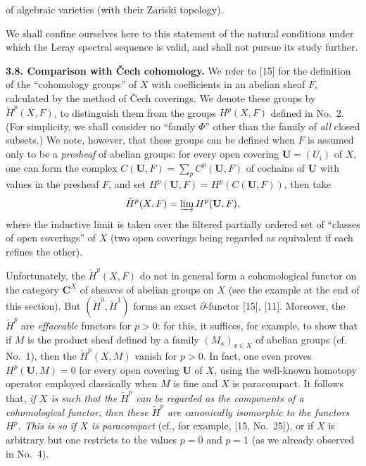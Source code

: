 
\noindent of algebraic varieties (with their Zariski topology).

We shall confine ourselves here to this statement of the natural conditions
under which the Leray spectral sequence is valid, and shall not pursue its
study further.

\textbf{3.8. Comparison with Čech cohomology.} We refer to [15] for the
definition of the ``cohomology groups'' of $X$ with coefficients in an
abelian sheaf $F$, calculated by the method of Čech coverings.
We denote these groups by $\check H^p(X,F)$, to distinguish them from the
groups $H^p(X,F)$ defined in No.~2. (For simplicity, we shall consider no
``family $\Phi$'' other than the family of \textit{all} closed subsets.) We note,
however, that these groups can be defined when $F$ is assumed only to be a
\textit{presheaf} of abelian groups:
for every open covering $\mathbf U=(U_i)$ of $X$, one can form the complex
$C(\mathbf U,F)=\displaystyle\sum\limits_p C^p(\mathbf U,F)$
of cochains of $\mathbf U$ with values in the presheaf $F$, and set
$H^p(\mathbf U,F)=H^p(C(\mathbf U,F))$,
then take
\[
\check H^p(X,F)=\varinjlim H^p(\mathbf U,F),
\]
where the inductive limit is taken over the filtered partially ordered set of
``classes of open coverings'' of $X$ (two open coverings being regarded as
equivalent if each refines the other).

Unfortunately, the $\check H^p(X,F)$ do not in general form a cohomological
functor on the category $\mathbf C^X$ of sheaves of abelian groups on $X$ (see the
example at the end of this section).
But $(\check H^0,\check H^1)$ forms an exact $\partial$-functor [15], [11].
Moreover, the $\check H^p$ are \textit{effaceable} functors for $p>0$:
for this, it suffices, for example, to show that if $M$ is the product sheaf
defined by a family $(M_x)_{x\in X}$ of abelian groups (cf. No.~1), then the
$\check H^p(X,M)$ vanish for $p>0$. In fact, one even proves
$H^p(\mathbf U,M)=0$ for every open covering $\mathbf U$ of $X$, using the
well-known homotopy operator employed classically when $M$ is fine and $X$ is
paracompact.
It follows that, \textit{if $X$ is such that the $\check H^p$ can be regarded
as the components of a cohomological functor, then these $\check H^p$ are
canonically isomorphic to the functors $H^p$. This is so if $X$ is
paracompact} (cf., for example, [15, No.~25]), or if $X$ is arbitrary but one
restricts to the values $p=0$ and $p=1$ (as we already observed in No.~4).

